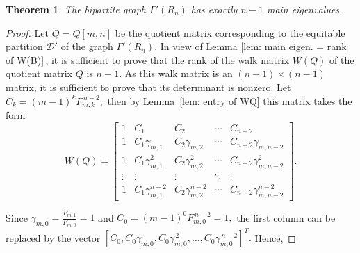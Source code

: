 \documentclass[11pt,oneside]{article}
\theoremstyle{plain}
\theoremstyle{plain}
\newtheorem{theorem}{Theorem}[section]
\theoremstyle{definition}
\numberwithin{figure}{section}
\theoremstyle{remark}
\numberwithin{equation}{section}
\begin{document}
		
		\begin{theorem}\label{thm:Q-rank}
			The bipartite graph $\Gamma'(R_n)$ has exactly $n-1$ main eigenvalues.
		\end{theorem}
		\begin{proof}
			Let $ Q = Q[m, n]$ be the quotient matrix corresponding to the equitable partition $\mathcal{D'}$ of the graph $\Gamma'(R_n).$ In view of Lemma \ref{lem: main eigen. = rank of W(B)}\,, it is sufficient to prove that the rank of the walk matrix $W(Q)$ of the quotient matrix $Q$ is $n-1.$ As this walk matrix is an $(n-1)\times(n-1)$ matrix, it is sufficient to prove that its determinant is nonzero. Let $C_k = (m-1)^{k} F_{m,k}^{\,n-2},$ then by Lemma~\ref{lem: entry of WQ} this matrix takes the form
			\[\renewcommand{\arraystretch}{1.2}
			W(Q) =
			\begin{bmatrix}
				1 & C_1 & C_2 & \cdots & C_{n-2} \\
				1 & C_1 \gamma_{m,1} & C_2 \gamma_{m,2} & \cdots & C_{n-2} \gamma_{m,n-2} \\
				1 & C_1 \gamma_{m,1}^2 & C_2 \gamma_{m,2}^2 & \cdots & C_{n-2} \gamma_{m,n-2}^2 \\
				\vdots & \vdots  & \vdots & \ddots & \vdots \\
				1 & C_1 \gamma_{m,1}^{n-2} & C_2 \gamma_{m,2}^{n-2} & \cdots & C_{n-2} \gamma_{m,n-2}^{n-2}
			\end{bmatrix}.
			\]
			
			
			Since $\gamma_{m,0}= \frac{F_{m,1}}{F_{m,0}} =1$ and $C_0 =(m-1)^{0} F_{m,0}^{\,n-2} = 1,$ the first column can be replaced by the vector 
			$[C_0,C_0\gamma_{m,0}, C_0\gamma_{m,0}^{\,2},\dots, C_0\gamma_{m,0}^{\,n-2}]^T.$ Hence, 
			

\end{proof}
\end{document}

